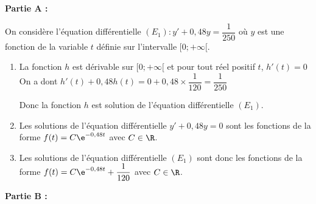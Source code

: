 \medskip

\textbf{Partie A : }
\medskip

On considère l'équation différentielle $\left(E_{1}\right): y'+0,48 y=\dfrac{1}{250}$ où $y$ est une fonction de la variable $t$ définie sur l'intervalle $[0 ;+\infty[$.

\begin{enumerate}
\item La fonction $h$ est dérivable  sur $[0 ;+\infty[$ et pour  tout réel positif $t$, $h'(t)=0$ 
On a dont $h'(t) +0,48 h(t) =0 + 0,48 \times \dfrac{1}{120}= \dfrac{1}{250}$ 

Donc  la fonction $h$ est solution de l'équation différentielle $\left(E_{1}\right)$.
\item Les solutions de l'équation différentielle $y'+0,48 y=0$ sont les fonctions de la forme $f(t) =C \e^{-0,48t}$ avec $C \in \R$. 
\item Les solutions de l'équation différentielle $\left(E_{1}\right)$ sont donc les fonctions de la forme $f(t) =C \e^{-0,48t} + \dfrac{1}{120}$ avec $C \in \R$.
\end{enumerate}
\medskip

\textbf{Partie B :}
\medskip


